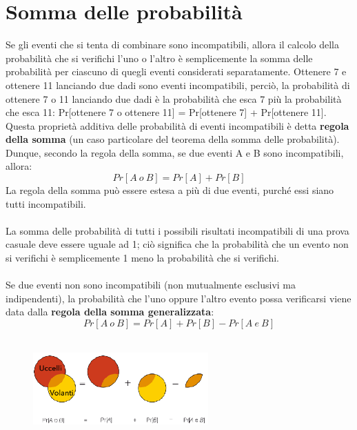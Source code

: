 \documentclass[10pt, draft]{book}
\begin{document}
\section{Somma delle probabilità}
Se gli eventi che si tenta di combinare sono incompatibili, allora il calcolo della probabilità che si verifichi l'uno o l'altro è semplicemente la somma delle probabilità per ciascuno di quegli eventi considerati separatamente. Ottenere 7 e ottenere 11 lanciando due dadi sono eventi incompatibili, perciò, la probabilità di ottenere 7 o 11 lanciando due dadi è la probabilità che esca 7 più la probabilità che esca 11: Pr[ottenere 7 o ottenere 11] = Pr[ottenere 7] + Pr[ottenere 11].
\\
Questa proprietà additiva delle probabilità di eventi incompatibili è detta \textbf{regola della somma} (un caso particolare del teorema della somma delle probabilità). 
\\
Dunque, secondo la regola della somma, se due eventi A e B sono incompatibili, allora: 
\begin{equation}
    Pr[A\ o\ B] = Pr[A] + Pr[B]
\end{equation}
La regola della somma può essere estesa a più di due eventi, purché essi siano tutti incompatibili.
\\
\\
La somma delle probabilità di tutti i possibili risultati incompatibili di una prova casuale deve essere uguale ad 1; ciò significa che la probabilità che un evento non si verifichi è semplicemente 1 meno la probabilità che si verifichi.
\\
\\
Se due eventi non sono incompatibili (non mutualmente esclusivi ma indipendenti), la probabilità che l'uno oppure l'altro evento possa verificarsi viene data dalla \textbf{regola della somma generalizzata}:
\begin{equation}
    Pr[A\ o\ B] = Pr[A] + Pr[B] - Pr[A\ e\ B]
\end{equation}\\
\begin{figure}[h]\label{fig5.5-2}
    \centering
    \includegraphics[width=0.6\textwidth]{fig5.5-2}
    \caption{\small{}}
\end{figure}
\end{document}
